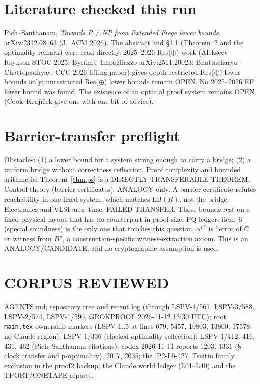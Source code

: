 \documentclass[11pt]{article}
\theoremstyle{definition}
\begin{document}
\section*{Literature checked this run}
Pich--Santhanam, \emph{Towards P$\ne$NP from Extended Frege lower bounds}, arXiv:2312.08163 (J.~ACM 2026). The abstract and \S1.1 (Theorem~2 and the optimality remark) were read directly. 2025--2026 Res($\oplus$) work (Alekseev--Itsykson STOC 2025; Byramji--Impagliazzo arXiv:2511.20023; Bhattacharya--Chattopadhyay; CCC 2026 lifting paper) gives depth-restricted Res($\oplus$) lower bounds only; unrestricted Res($\oplus$) lower bounds remain OPEN. No 2025--2026 EF lower bound was found. The existence of an optimal proof system remains OPEN (Cook--Kraj\'{\i}\v{c}ek give one with one bit of advice).

\section*{Barrier-transfer preflight}
Obstacles: (1) a lower bound for a system strong enough to carry a bridge; (2) a uniform bridge without correctness reflection.
Proof complexity and bounded arithmetic: Theorem~\ref{thm:ps} is a DIRECTLY TRANSFERABLE THEOREM.
Control theory (barrier certificates): ANALOGY only. A barrier certificate refutes reachability in one fixed system, which matches LB$(R)$, not the bridge.
Electronics and VLSI area--time: FAILED TRANSFER. Those bounds rest on a fixed physical layout that has no counterpart in proof size.
PQ ledger: item~6 (special soundness) is the only one that touches this question. $\alpha^{n^k}$ is ``error of $C$ or witness from $B$'', a construction-specific witness-extraction axiom. This is an ANALOGY/CANDIDATE, and no cryptographic assumption is used.

\section*{CORPUS REVIEWED}
AGENTS.md; repository tree and recent log (through LSPV-4/561, LSPV-3/588, LSPV-2/574, LSPV-1/590, GROKPROOF 2026-11-12 13:30 UTC); root \texttt{main.tex} ownership markers (LSPV-1..5 at lines 679, 5457, 10803, 13800, 17578; no Claude region); LSPV-1/336 (clocked optimality reflection); LSPV-1/412, 416, 431, 462 (Pich--Santhanam citations); codex 2026-11-11 reports 1203, 1331 (\S\,clock transfer and p-optimality), 2017, 2035; the [P2-L5-427] Tseitin family exclusion in the proof2 backup; the Claude world ledger (L01--L40) and the TPORT/ONETAPE reports.
\end{document}
